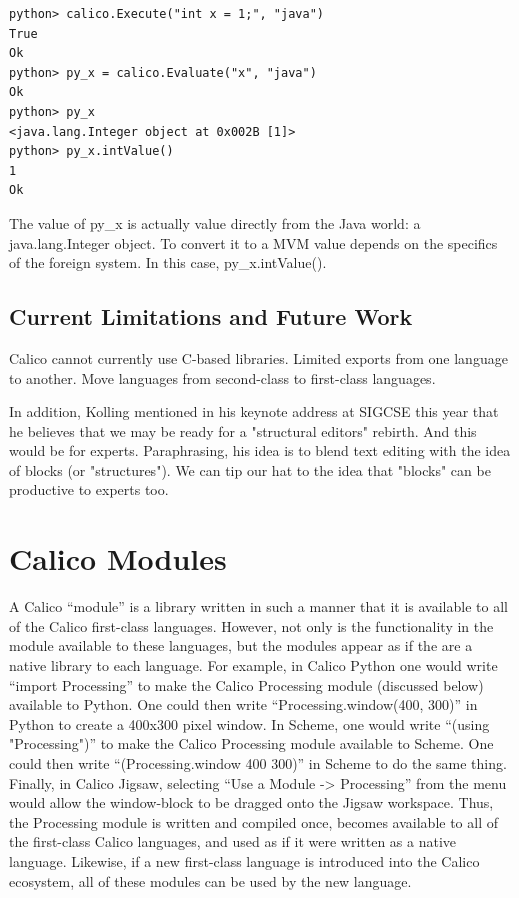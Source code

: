 \documentclass[preprint]{sigplanconf}
\begin{document}
\begin{verbatim}
python> calico.Execute("int x = 1;", "java")
True
Ok
python> py_x = calico.Evaluate("x", "java")
Ok
python> py_x
<java.lang.Integer object at 0x002B [1]>
python> py_x.intValue()
1
Ok
\end{verbatim}

The value of py\_x is actually value directly from the Java world: a
java.lang.Integer object. To convert it to a MVM value depends on the
specifics of the foreign system. In this case, py\_x.intValue().

\subsection{Current Limitations and Future Work}

Calico cannot currently use C-based libraries.
Limited exports from one language to another.
Move languages from second-class to first-class languages.

In addition, Kolling mentioned in his keynote address at SIGCSE this
year that he believes that we may be ready for a "structural editors"
rebirth. And this would be for experts. Paraphrasing, his idea is to
blend text editing with the idea of blocks (or "structures"). We can
tip our hat to the idea that "blocks" can be productive to experts
too.

\section{Calico Modules}

A Calico ``module'' is a library written in such a manner that it is
available to all of the Calico first-class languages. However, not
only is the functionality in the module available to these languages,
but the modules appear as if the are a native library to each
language. For example, in Calico Python one would write ``import
Processing'' to make the Calico Processing module (discussed below)
available to Python. One could then write ``Processing.window(400,
300)'' in Python to create a 400x300 pixel window. In Scheme, one
would write ``(using "Processing")'' to make the Calico Processing
module available to Scheme. One could then write ``(Processing.window
400 300)'' in Scheme to do the same thing. Finally, in Calico Jigsaw,
selecting ``Use a Module -> Processing'' from the menu would allow the
window-block to be dragged onto the Jigsaw workspace. Thus, the
Processing module is written and compiled once, becomes available to
all of the first-class Calico languages, and used as if it were
written as a native language. Likewise, if a new first-class language
is introduced into the Calico ecosystem, all of these modules can be
used by the new language.
\end{document}
